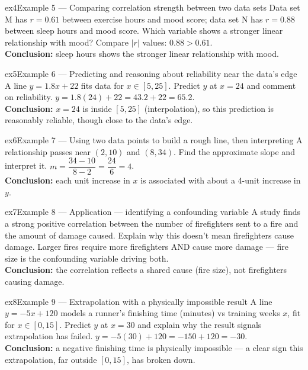 \documentclass[11pt]{article}
\begin{document}
\begin{example}{ex4}{Example 5 --- Comparing correlation strength between two data sets}
Data set M has $r=0.61$ between exercise hours and mood score; data set N has $r=0.88$ between sleep hours and mood score. Which variable shows a stronger linear relationship with mood?\soln
Compare $|r|$ values: $0.88>0.61$.\\[3pt]\textbf{Conclusion:} sleep hours shows the stronger linear relationship with mood.
\end{example}

\begin{example}{ex5}{Example 6 --- Predicting and reasoning about reliability near the data's edge}
A line $y=1.8x+22$ fits data for $x\in[5,25]$. Predict $y$ at $x=24$ and comment on reliability.\soln
$y=1.8(24)+22=43.2+22=65.2$.\\[3pt]\textbf{Conclusion:} $x=24$ is inside $[5,25]$ (interpolation), so this prediction is reasonably reliable, though close to the data's edge.
\end{example}

\begin{example}{ex6}{Example 7 --- Using two data points to build a rough line, then interpreting}
A relationship passes near $(2,10)$ and $(8,34)$. Find the approximate slope and interpret it.\soln
$m=\dfrac{34-10}{8-2}=\dfrac{24}{6}=4$.\\[3pt]\textbf{Conclusion:} each unit increase in $x$ is associated with about a 4-unit increase in $y$.
\end{example}

\begin{example}{ex7}{Example 8 --- Application --- identifying a confounding variable}
A study finds a strong positive correlation between the number of firefighters sent to a fire and the amount of damage caused. Explain why this doesn't mean firefighters cause damage.\soln
Larger fires require more firefighters AND cause more damage --- fire size is the confounding variable driving both.\\[3pt]\textbf{Conclusion:} the correlation reflects a shared cause (fire size), not firefighters causing damage.
\end{example}

\begin{example}{ex8}{Example 9 --- Extrapolation with a physically impossible result}
A line $y=-5x+120$ models a runner's finishing time (minutes) vs training weeks $x$, fit for $x\in[0,15]$. Predict $y$ at $x=30$ and explain why the result signals extrapolation has failed.\soln
$y=-5(30)+120=-150+120=-30$.\\[3pt]\textbf{Conclusion:} a negative finishing time is physically impossible --- a clear sign this extrapolation, far outside $[0,15]$, has broken down.
\end{example}
\end{document}
